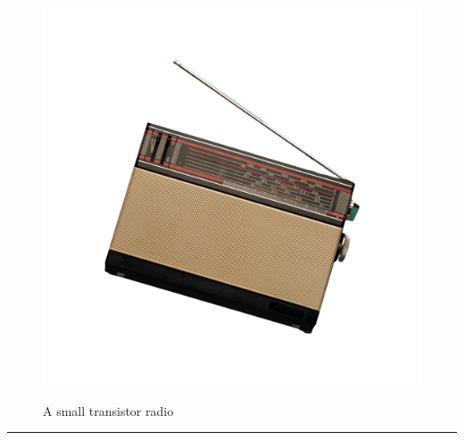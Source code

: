 \documentclass{article}
\begin{document}
    \begin{figure}[H]
        \centering
        \begin{minipage}{0.25\textwidth}
            \centering
            \includegraphics[width=\textwidth]{../SurvivalItemImages/radio}
        \end{minipage}\hfill
        \begin{minipage}{0.7\textwidth}
            \centering
            \Large A small transistor radio
        \end{minipage}
    \end{figure}
    \vspace{-0.8em}
    \noindent\rule{\textwidth}{0.4pt}
            
\end{document}
